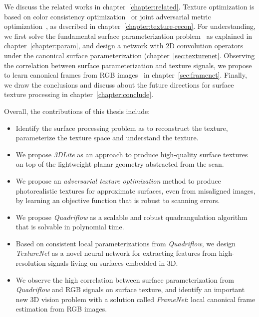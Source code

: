 We discuss the related works in chapter~\ref{chapter:related}. Texture optimization is based on color consistency optimization~\cite{huang20173dlite} or joint adversarial metric optimization~\cite{huang2020adversarial}, as described in chapter~\ref{chapter:texture-recon}. For understanding, we first solve the fundamental surface parameterization problem~\cite{huang2018quadriflow} as explained in chapter~\ref{chapter:param}, and design a network with 2D convolution operators~\cite{huang2018texturenet} under the canonical surface parameterization (chapter~\ref{sec:texturenet}. Observing the correlation between surface parameterization and texture signals, we propose to learn canonical frames from RGB images~\cite{framenet} in chapter~\ref{sec:framenet}. Finally, we draw the conclusions and discuss about the future directions for surface texture processing in chapter~\ref{chapter:conclude}.

Overall, the contributions of this thesis include:
\begin{itemize}
    \item Identify the surface processing problem as to reconstruct the texture, parameterize the texture space and understand the texture.
    \item We propose \emph{3DLite} as an approach to produce high-quality surface textures on top of the lightweight planar geometry abstracted from the scan.
    \item We propose an \emph{adversarial texture optimization} method to produce photorealistic textures for approximate surfaces, even from misaligned images, by learning an objective function that is robust to scanning errors.
    \item We propose \emph{Quadriflow} as a scalable and robust quadrangulation algorithm that is solvable in polynomial time.
    \item Based on consistent local parameterizations from \emph{Quadriflow}, we design \emph{TextureNet} as a novel neural network for extracting features from high-resolution signals living on surfaces embedded in 3D.
    \item We observe the high correlation between surface parameterization from \emph{Quadriflow} and RGB signals on surface texture, and identify an important new 3D vision problem with a solution called \emph{FrameNet}: local canonical frame estimation from RGB images.
\end{itemize}
